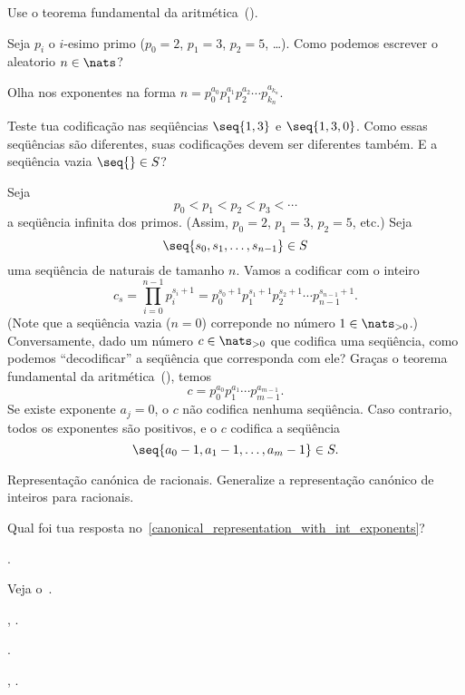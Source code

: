 \hint Use o teorema fundamental da aritmética~().

\hint
Seja $p_i$ o $i$-esimo primo ($p_0 = 2$, $p_1 = 3$, $p_2 = 5$, \dots).
Como podemos escrever o aleatorio $n\in\nats$?

\hint
Olha nos exponentes na forma
$
n =
p_0^{a_0}
p_1^{a_1}
p_2^{a_2}
\cdots
p_{k_n}^{a_{k_n}}
$.

\hint
Teste tua codificação nas seqüências $\seq{1,3}$ e $\seq{1,3,0}$.
Como essas seqüências são diferentes, suas codificações devem ser diferentes também.
E a seqüência vazia $\seq{}\in S$?  

\solution
Seja
$$
p_0 < p_1 < p_2 < p_3 < \dotsb
$$
a seqüência infinita dos primos.  (Assim, $p_0 = 2$, $p_1 = 3$, $p_2 = 5$, etc.)
Seja
$$
\seq{s_0, s_1, \dotsc, s_{n-1}} \in S
$$
uma seqüência de naturais de tamanho $n$.
Vamos a codificar com o inteiro
$$
c_s
= \prod_{i=0}^{n-1} p_i^{s_i + 1}
= p_0^{s_0 + 1} p_1^{s_1 + 1} p_2^{s_2 + 1} \cdots p_{n-1}^{s_{n-1} + 1}.
$$
(Note que a seqüência vazia ($n=0$) correponde no número $1\in\nats_{>0}$.)
\endgraf
Conversamente, dado um número $c\in\nats_{>0}$ que codifica uma seqüência,
como podemos ``decodificar'' a seqüência que corresponda com ele?
Graças o teorema fundamental da aritmética~(),
temos
$$
c = p_0^{a_0} p_1^{a_1} \cdots p_{m-1}^{a_{m-1}}.
$$
Se existe exponente $a_j = 0$, o $c$ não codifica nenhuma seqüência.
Caso contrario, todos os exponentes são positivos, e o $c$ codifica
a seqüência
$$
\seq{a_0-1, a_1-1, \dotsc, a_m-1} \in S.
$$

\endproblem

\problem Representação canónica de racionais.
\label{canonical_representation_of_rats}
Generalize a representação canónico de inteiros para racionais.

\hint
Qual foi tua resposta no~\ref{canonical_representation_with_int_exponents}?

\endproblem

\endproblems

\further.

Veja o~\cite[\S\S1.6--1.8]{babybm}.

\cite{elements},
\cite{disquisitiones}.

\cite{andrewsnumber}.

\cite{nivennumbers},
\cite{hardywright}.

\endfurther

\endchapter

